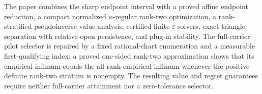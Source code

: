 The paper combines the sharp endpoint interval with a proved affine endpoint reduction, a compact normalized \(\kappa\)-regular rank-two optimization, a rank-stratified pseudoinverse value analysis, certified finite-\(\varepsilon\) solvers, exact triangle separation with relative-open persistence, and plug-in stability.  The full-carrier pilot selector is repaired by a fixed rational-chart enumeration and a measurable first-qualifying index: a proved one-sided rank-two approximation shows that its empirical infimum equals the all-rank empirical infimum whenever the positive-definite rank-two stratum is nonempty.  The resulting value and regret guarantees require neither full-carrier attainment nor a zero-tolerance selector.